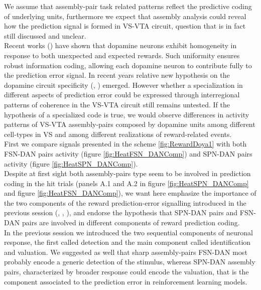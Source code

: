 We assume that assembly-pair task related patterns reflect the predictive coding of underlying units, furthermore we expect that assembly analysis could reveal how the prediction signal is formed in VS-VTA circuit, question that is in fact still discussed and unclear.\\Recent works (\cite{UchidaDop}) have shown that dopamine neurons exhibit homogeneity in response to both unexpected and expected rewards. Such uniformity ensures robust information coding, allowing each dopamine neuron to contribute fully to the prediction error signal. In recent years relative new hypothesis on the dopamine circuit specificity (\cite{Takahashi2016}, \cite{Saunders2018}) emerged. However whether a specialization in different aspects of prediction error could be expressed through interregional patterns of coherence in the VS-VTA circuit still remains untested. If the hypothesis of a specialized code is true, we would observe differences in activity patterns of VS-VTA assembly-pairs composed by dopamine units among different cell-types in VS and among different realizations of reward-related events.\\First we compare signals presented in the scheme \ref{fig:RewardDoya1} with both FSN-DAN pairs activity (figure \ref{fig:HeatFSN_DANComp}) and SPN-DAN pairs activity (figure \ref{fig:HeatSPN_DANComp}).\\Despite at first sight both assembly-pairs type seem to be involved in prediction coding in the hit trials (panels A.1 and A.2 in figure \ref{fig:HeatSPN_DANComp} and figure \ref{fig:HeatFSN_DANComp}), we want here emphasize the importance of the two components of the reward prediction-error signalling introduced in the previous session (\cite{Tobler2003}, \cite{Nomoto2010}, \cite{Fiorillo2013} \cite{Schultz2016}), and endorse the hypothesis that SPN-DAN pairs and FSN-DAN pairs are involved in different components of reward prediction coding.\\
In the previous session we introduced the two sequential components of neuronal response, the first called detection and the main component called identification and valuation. We suggested as well that sharp assembly-pairs FSN-DAN most probably encode a generic detection of the stimulus, whereas SPN-DAN assembly pairs, characterized by broader response could encode the valuation, that is the component associated to the prediction error in reinforcement learning models.\\
